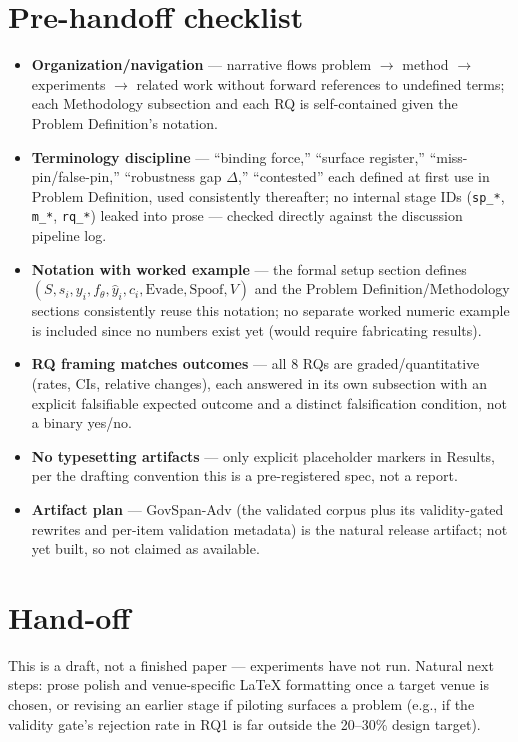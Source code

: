\documentclass[11pt]{article}
\begin{document}
\section*{Pre-handoff checklist}
\begin{itemize}[leftmargin=1.4em]
\item \textbf{Organization/navigation} --- narrative flows problem $\to$ method $\to$ experiments $\to$ related work without forward references to undefined terms; each Methodology subsection and each RQ is self-contained given the Problem Definition's notation.
\item \textbf{Terminology discipline} --- ``binding force,'' ``surface register,'' ``miss-pin/false-pin,'' ``robustness gap $\Delta$,'' ``contested'' each defined at first use in Problem Definition, used consistently thereafter; no internal stage IDs (\texttt{sp\_*}, \texttt{m\_*}, \texttt{rq\_*}) leaked into prose --- checked directly against the discussion pipeline log.
\item \textbf{Notation with worked example} --- the formal setup section defines $(S, s_i, y_i, f_\theta, \hat y_i, c_i, \text{Evade}, \text{Spoof}, V)$ and the Problem Definition/Methodology sections consistently reuse this notation; no separate worked numeric example is included since no numbers exist yet (would require fabricating results).
\item \textbf{RQ framing matches outcomes} --- all 8 RQs are graded/quantitative (rates, CIs, relative changes), each answered in its own subsection with an explicit falsifiable expected outcome and a distinct falsification condition, not a binary yes/no.
\item \textbf{No typesetting artifacts} --- only explicit placeholder markers in Results, per the drafting convention this is a pre-registered spec, not a report.
\item \textbf{Artifact plan} --- GovSpan-Adv (the validated corpus plus its validity-gated rewrites and per-item validation metadata) is the natural release artifact; not yet built, so not claimed as available.
\end{itemize}

\section*{Hand-off}
This is a draft, not a finished paper --- experiments have not run. Natural next steps: prose polish and venue-specific LaTeX formatting once a target venue is chosen, or revising an earlier stage if piloting surfaces a problem (e.g., if the validity gate's rejection rate in RQ1 is far outside the 20--30\% design target).
\end{document}
